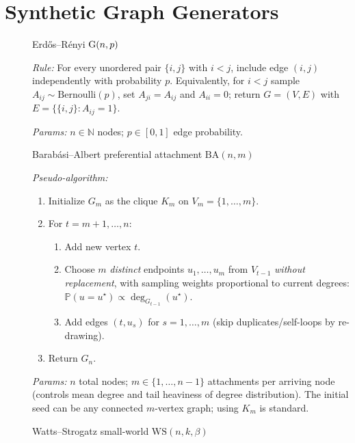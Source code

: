 \documentclass[twoside,11pt]{article}
\numberwithin{equation}{section}
\numberwithin{theorem}{section}
\numberwithin{example}{section}
\begin{document}
\section{Synthetic Graph Generators}
\label{appendix:graph-gen}
\begin{description}
\item[]\textsf{Erd\H{o}s--R\'enyi} ${\rm G}(n,p)$

\emph{Rule:} For every unordered pair $\{i,j\}$ with $i<j$,
include edge $(i,j)$ independently with probability $p$.
Equivalently, for $i<j$ sample $A_{ij}\sim \mathrm{Bernoulli}(p)$, set $A_{ji}=A_{ij}$ and $A_{ii}=0$; return $G=(V,E)$ with $E=\{\{i,j\}:A_{ij}=1\}$.

\emph{Params:} $n\in\mathbb{N}$ nodes; $p\in[0,1]$ edge probability.

\item[]\textsf{Barab\'asi--Albert preferential attachment} $\mathrm{BA}(n,m)$

\emph{Pseudo-algorithm:}
\begin{enumerate}
\item Initialize $G_m$ as the clique $K_m$ on $V_m=\{1,\dots,m\}$.
\item For $t=m+1,\dots,n$:
  \begin{enumerate}
    \item Add new vertex $t$.
    \item Choose $m$ \emph{distinct} endpoints $u_1,\dots,u_m$ from $V_{t-1}$ \emph{without replacement},
          with sampling weights proportional to current degrees:
          \(
          \mathbb{P}(u=u^\star)\propto \deg_{G_{t-1}}(u^\star).
          \)
    \item Add edges $(t,u_s)$ for $s=1,\dots,m$ (skip duplicates/self-loops by re-drawing).
  \end{enumerate}
\item Return $G_n$.
\end{enumerate}
\emph{Params:} $n$ total nodes; $m\in\{1,\dots,n-1\}$ attachments per arriving node (controls mean degree and tail heaviness of degree distribution). The initial seed can be any connected $m$-vertex graph; using $K_m$ is standard.

\item[]\textsf{Watts--Strogatz small-world} $\mathrm{WS}(n,k,\beta)$


\end{description}
\end{document}
